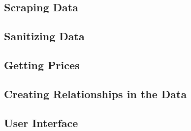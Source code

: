 \documentclass{article}
\begin{document}
\subsection{Scraping Data}

\subsection{Sanitizing Data}

\subsection{Getting Prices}

\subsection{Creating Relationships in the Data}

\subsection{User Interface}
\end{document}
